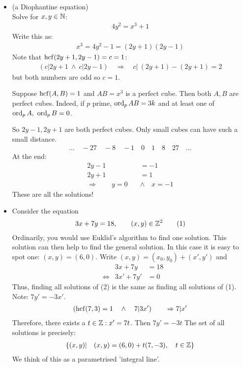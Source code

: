 \begin{ex} 
\begin{itemize}
\item
(a Diophantine equation) \\
Solve for $x,y \in \mathbb N$:
\begin{align*}
4y^2 = x^3+1
\end{align*}
Write this as: 
\begin{align*}
x^3 = 4y^2 -1 = (2y+1)(2y-1)
\end{align*}
Note that $\operatorname{hcf}(2y+1,2y-1) = c = 1$:
\begin{align*}
(c|2y+1~ \wedge ~ c|2y-1) \quad \Rightarrow \quad c| ~(2y+1)- (2y+1)= 2
\end{align*}
but both numbers are odd so $c=1$. 

Suppose $\operatorname{hcf}(A,B) = 1$ and $AB = x^3$ is a perfect cube. Then both $A,B$ are perfect cubes. Indeed, if $p$ prime, $\operatorname{ord}_p AB = 3k$ and at least one of $\operatorname{ord}_p A, ~\operatorname{ord}_p B =0$.

So $2y-1, 2y+1$ are both perfect cubes. Only small cubes can have such a small distance.
\begin{align*}
\dots \quad -27\quad -8 \quad -1 \quad 0 \quad 1 \quad 8 \quad 27 \quad \dots
\end{align*}
At the end: 
\begin{align*}
2y-1 & = -1 \\
2y+1 & = 1 \\
\Rightarrow \qquad y =0 \quad & \wedge  \quad x = -1
\end{align*}
These are all the solutions!
\item
Consider the equation
\begin{align*}
3x + 7y = 18, \qquad (x,y) \in \mathbb Z^2 \tag{1}
\end{align*}
Ordinarily, you would use Euklid's algorithm to find one solution. This solution can then help to find the general solution.
In this case it is easy to spot one: $(x,y) = (6,0)$.
Write $(x,y) = (x_0,y_0) + (x',y')$ and 
\begin{align*}
& & 3x + 7y & = 18 \\
& \Leftrightarrow & 3x' + 7y' & = 0 \tag{2}
\end{align*}
Thus, finding all solutions of (2) is the same as finding all solutions of (1).
Note: $7y' = -3x'$.
\begin{align*}
(\operatorname{hcf}(7,3) = 1 \quad \wedge \quad 7|3x') \qquad \Rightarrow 7|x'
\end{align*}
Therefore, there exists a $t \in \mathbb Z : x' = 7t$.
Then $7y' = -3 t$ 
The set of all solutions is precisely:
\begin{align*}
\{ (x, y)| \quad (x,y)= (6,0) + t(7,-3), \quad  t \in \mathbb Z \}
\end{align*}
We think of this as a parametrised 'integral line'.
\end{itemize}
\end{ex}

